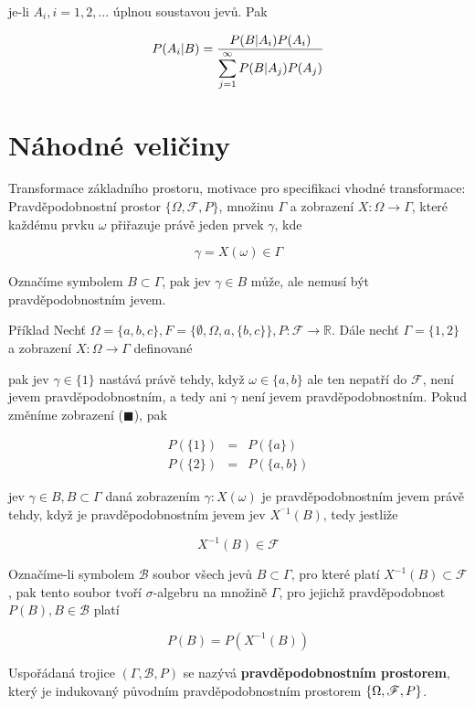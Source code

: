 je-li $A_i,i=1,2,\ldots$ úplnou soustavou jevů. Pak

\[ P(A_i|B)=\frac{P(B|A_i)P(A_i)}{\displaystyle\sumi[j] P(B|A_j)P(A_j)} \]

\section{Náhodné veličiny}
Transformace základního prostoru, motivace pro specifikaci vhodné transformace: Pravděpodobnostní prostor $\{\Omega, \mathscr{F}, P\}$, množinu $\Gamma$ a zobrazení $X:\Omega\to\Gamma$, které každému prvku $\omega$ přiřazuje právě jeden prvek $\gamma$, kde

\[ \gamma=X(\omega)\in\Gamma \]

Označíme symbolem $B\subset\Gamma$, pak jev $\gamma\in B$ může, ale nemusí být pravděpodobnostním jevem.

\begin{note}{Příklad}
Nechť $\Omega=\{a,b,c\}, F=\{\emptyset,\Omega,a,\{b,c\}\}, P:\mathscr{F}\to\mathbb{R}$. Dále nechť $\Gamma=\{1,2\}$ a zobrazení $X:\Omega\to\Gamma$ definované

	\begin{figure}
		
	\end{figure}

	pak jev $\gamma\in\{1\}$ nastává právě tehdy, když $\omega\in\{a,b\}$ ale ten nepatří do $\mathscr{F}$, není jevem pravděpodobnostním, a tedy ani $\gamma$ není jevem pravděpodobnostním. Pokud změníme zobrazení ({\color{red}$\blacksquare$}), pak

	\begin{eqnarray*}
	P(\{1\}) &=& P(\{a\})\\
	P(\{2\}) &=& P(\{a,b\})
	\end{eqnarray*}

	jev $\gamma\in B, B\subset\Gamma$ daná zobrazením $\gamma:X(\omega)$ je pravděpodobnostním jevem právě tehdy, když je pravděpodobnostním jevem jev $X^{^-1}(B)$, tedy jestliže

	\[ X^{-1}(B)\in\mathscr{F} \]

	Označíme-li symbolem $\mathscr{B}$ soubor všech jevů $B\subset\Gamma$, pro které platí $X^{-1}(B)\subset\mathscr{F}$, pak tento soubor tvoří $\sigma$-algebru na množině $\Gamma$, pro jejichž pravděpodobnost $P(B),B\in\mathscr{B}$ platí

	\[ P(B)=P(X^{-1}(B)) \]

	Uspořádaná trojice $(\Gamma,\mathscr{B},P)$ se nazývá \textbf{pravděpodobnostním prostorem}, který je indukovaný původním pravděpodobnostním prostorem $\brs{\Omega,\mathscr{F}, P}$.
	\end{note}


